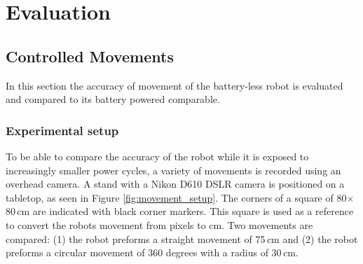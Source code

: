 \chapter{Evaluation}
\label{chp:evaluation}

\section{Controlled Movements}
\label{sec:controlled_movements}




In this section the accuracy of movement of the battery-less robot is evaluated and compared to its battery powered comparable.

\subsection{Experimental setup}

To be able to compare the accuracy of the robot while it is exposed to increasingly smaller power cycles, a variety of movements is recorded using an overhead camera.
A stand with a Nikon D610 DSLR camera is positioned on a tabletop, as seen in Figure \ref{fig:movement_setup}.
The corners of a square of 80$\times$80\,cm are indicated with black corner markers.
This square is used as a reference to convert the robots movement from pixels to cm.
Two movements are compared: (1) the robot preforms a straight movement of 75\,cm and (2) the robot preforms a circular movement of 360 degrees with a radius of 30\,cm.

